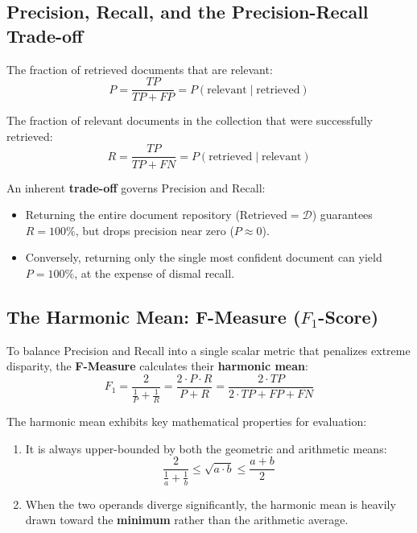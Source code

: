 \subsection{Precision, Recall, and the Precision-Recall Trade-off}
\begin{definition}[Precision ($P$)]
The fraction of retrieved documents that are relevant:
\begin{equation}
P = \frac{TP}{TP + FP} = P(\text{relevant} \mid \text{retrieved})
\end{equation}
\end{definition}

\begin{definition}[Recall ($R$)]
The fraction of relevant documents in the collection that were successfully retrieved:
\begin{equation}
R = \frac{TP}{TP + FN} = P(\text{retrieved} \mid \text{relevant})
\end{equation}
\end{definition}

An inherent \textbf{trade-off} governs Precision and Recall:
\begin{itemize}
    \item Returning the entire document repository ($\text{Retrieved} = \mathcal{D}$) guarantees $R = 100\%$, but drops precision near zero ($P \approx 0$).
    \item Conversely, returning only the single most confident document can yield $P = 100\%$, at the expense of dismal recall.
\end{itemize}

\subsection{\texorpdfstring{The Harmonic Mean: F-Measure ($F_1$-Score)}{The Harmonic Mean: F-Measure (F1-Score)}}
To balance Precision and Recall into a single scalar metric that penalizes extreme disparity, the \textbf{F-Measure} calculates their \textbf{harmonic mean}:
\begin{equation}
F_1 = \frac{2}{\frac{1}{P} + \frac{1}{R}} = \frac{2 \cdot P \cdot R}{P + R} = \frac{2 \cdot TP}{2 \cdot TP + FP + FN}
\end{equation}

\begin{property}
The harmonic mean exhibits key mathematical properties for evaluation:
\begin{enumerate}
    \item It is always upper-bounded by both the geometric and arithmetic means:
    \[
    \frac{2}{\frac{1}{a} + \frac{1}{b}} \le \sqrt{a \cdot b} \le \frac{a + b}{2}
    \]
    \item When the two operands diverge significantly, the harmonic mean is heavily drawn toward the \textbf{minimum} rather than the arithmetic average.
\end{enumerate}
\end{property}

